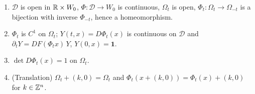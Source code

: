 \begin{lemma}\label{bpN:p12:flow}
\begin{enumerate}[label=(\alph*)]
\item $\mathcal D$ is open in $\mathbb{R}\times W_0$, $\Phi:\mathcal D\to W_0$ is continuous, $\Omega_t$ is open, $\Phi_t:\Omega_t\to\Omega_{-t}$ is a bijection with inverse $\Phi_{-t}$, hence a homeomorphism.
\item $\Phi_t$ is $C^1$ on $\Omega_t$; $Y(t,x)=D\Phi_t(x)$ is continuous on $\mathcal D$ and $\partial_tY=DF(\Phi_t x)\,Y$, $Y(0,x)=\mathbf 1$.
\item $\det D\Phi_t(x)=1$ on $\Omega_t$.
\item (Translation) $\Omega_t+(k,0)=\Omega_t$ and $\Phi_t(x+(k,0))=\Phi_t(x)+(k,0)$ for $k\in\mathbb{Z}^n$.
\end{enumerate}
\end{lemma}

